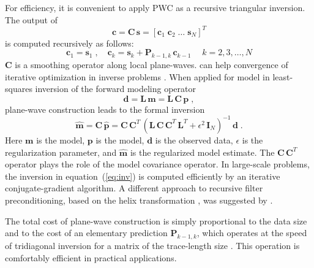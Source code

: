 For efficiency, it is convenient to apply PWC as a recursive triangular inversion. The output
of
\begin{equation}
  \label{eq:pwc}
  \mathbf{c} = \mathbf{C\,s} = \left[\mathbf{c}_1 \; \mathbf{c}_2 \; \ldots \;
    \mathbf{s}_N\right]^T
\end{equation}
is computed recursively as follows:
\begin{equation}
  \label{eq:rec}
  \mathbf{c}_1 = \mathbf{s}_1\;,\quad
  \mathbf{c}_k = \mathbf{s}_k + \mathbf{P}_{k-1,k}\,\mathbf{c}_{k-1}\;\quad
  k=2,3,\ldots,N
\end{equation}
$\mathbf{C}$ is a smoothing operator along local
plane-waves.  can help 
 convergence of iterative optimization in inverse
problems \cite[]{harlan,GEO68-02-05770588}.  When applied for model
  in least-squares
inversion of the forward modeling operator
\begin{equation}
  \label{eq:for}
  \mathbf{d} = \mathbf{L\,m} = \mathbf{L\,C\,p}\;,
\end{equation}
plane-wave construction leads to the formal inversion
\begin{equation}
  \label{eq:inv}
  \widehat{\mathbf{m}} = \mathbf{C}\,\widehat{\mathbf{p}} =
\mathbf{C\,C}^T\,\left(\mathbf{L\,C\,C}^T\,\mathbf{L}^T + \epsilon^2\,\mathbf{I}_N\right)^{-1}\,\mathbf{d}\;.
\end{equation}
Here $\mathbf{m}$ is the model, $\mathbf{p}$ is the  
model, $\mathbf{d}$ is the observed data, $\epsilon$ is the
regularization parameter, and $\widehat{\mathbf{m}}$ is the
regularized model estimate. The $\mathbf{C}\,\mathbf{C}^T$ operator
plays the role of the model covariance operator. %
In large-scale
problems, the inversion in equation~(\ref{eq:inv}) is computed efficiently by
an iterative conjugate-gradient algorithm.  A different approach to recursive
filter preconditioning, based on the helix transformation
\cite[]{GEO63-05-15321541}, was suggested by \cite{GEO68-02-05770588}.

The total cost of plane-wave construction is simply proportional to the data
size and to the cost of an elementary prediction $\mathbf{P}_{k-1,k}$, which
operates at the speed of tridiagonal inversion for a matrix of the
trace-length size \cite[]{GEO67-06-19461960}. This operation is comfortably
efficient in practical applications.

